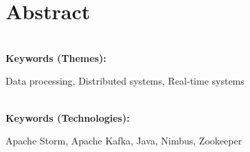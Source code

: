 \titleformat{\chapter}[display]
{\normalfont\bfseries}{}{0pt}{\Huge}

\chapter*{Abstract}



\textbf{\\Keywords (Themes):} 

Data processing, Distributed systems, Real-time systems

\textbf{\\Keywords (Technologies):} 

Apache Storm, Apache Kafka, Java, Nimbus, Zookeeper
